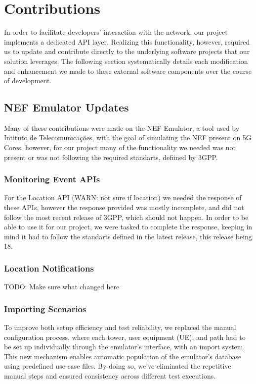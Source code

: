 \chapter{Contributions}

In order to facilitate developers’ interaction with the network, our project implements a dedicated API layer. Realizing this functionality, however, required us to update and contribute directly to the underlying software projects that our solution leverages. The following section systematically details each modification and enhancement we made to these external software components over the course of development.

\section{NEF Emulator Updates}

Many of these contributions were made on the NEF Emulator, a tool used by Intituto de Telecomunicações, with the goal of simulating the NEF present on 5G Cores, however, for our project many of the functionality we needed was not present or was
not following the required standarts, defiined by 3GPP.

\subsection{Monitoring Event APIs}

For the Location API (WARN: not sure if location) we needed the response of these APIs, however the response provided was mostly incomplete, and did not follow the most recent release of 3GPP, which  should not happen. In order to be able to use it for our project, we were tasked to complete the response, keeping in mind it had to follow the standarts defined in the latest release, this release being 18.

\subsection{Location Notifications}

TODO: Make sure what changed here

\subsection{Importing Scenarios}

To improve both setup efficiency and test reliability, we replaced the manual configuration process, where each tower, user equipment (UE), and path had to be set up individually through the emulator’s interface, with an import system. This new mechanism enables automatic population of the emulator’s database using predefined use-case files. By doing so, we’ve eliminated the repetitive manual steps and ensured consistency across different test executions.
